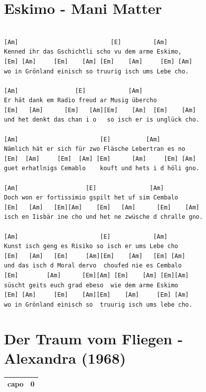 \documentclass[
]{book}
\let\stdsection\section
\renewcommand\section{\clearpage\stdsection}
\begin{document}
\hypertarget{eskimo---mani-matter}{%
\section{Eskimo - Mani Matter}\label{eskimo---mani-matter}}

\begin{verbatim}

[Am]                          [E]         [Am]
Kenned ihr das Gschichtli scho vu dem arme Eskimo,
[Em] [Am]     [Em]    [Am] [Em]    [Am]     [Em] [Am]
wo in Grönland einisch so truurig isch ums Lebe cho.

[Am]                [E]            [Am]
Er hät dank em Radio freud ar Musig übercho
[Em]   [Am]      [Em]   [Am][Em]    [Am]  [Em]    [Am]
und het denkt das chan i o   so isch er is unglück cho.

[Am]                       [E]          [Am]
Nämlich hät er sich für zwo Fläsche Lebertran es no
[Em]  [Am]     [Em]  [Am] [Em]      [Am]     [Em] [Am]
guet erhatlnigs Cemablo    kouft und hets i d höli gno.

[Am]                   [E]               [Am]
Doch won er fortissimio gspilt het uf sim Cembalo
[Em]   [Am]   [Em][Am]    [Em]   [Am]      [Em]    [Am]
isch en Iisbär ine cho und het ne zwüsche d chralle gno.

[Am]                       [E]            [Am]
Kunst isch geng es Risiko so isch er ums Lebe cho
[Em]   [Am]   [Em]     [Am][Em]    [Am]   [Em] [Am]
und das isch d Moral dervo  choufed nie es Cembalo
[Em]        [Am]      [Em][Am] [Em]    [Am] [Em][Am]
süscht geits euch grad ebeso  wie dem arme Eskimo
[Em] [Am]     [Em]    [Am][Em]    [Am]     [Em] [Am]
wo in Grönland einisch so  truurig isch ums lebe cho.

\end{verbatim}

\hypertarget{der-traum-vom-fliegen---alexandra-1968}{%
\section{Der Traum vom Fliegen - Alexandra (1968)}\label{der-traum-vom-fliegen---alexandra-1968}}

\begin{longtable}[]{@{}ll@{}}
\toprule
\endhead
capo & 0\tabularnewline
\bottomrule
\end{longtable}
\end{document}
